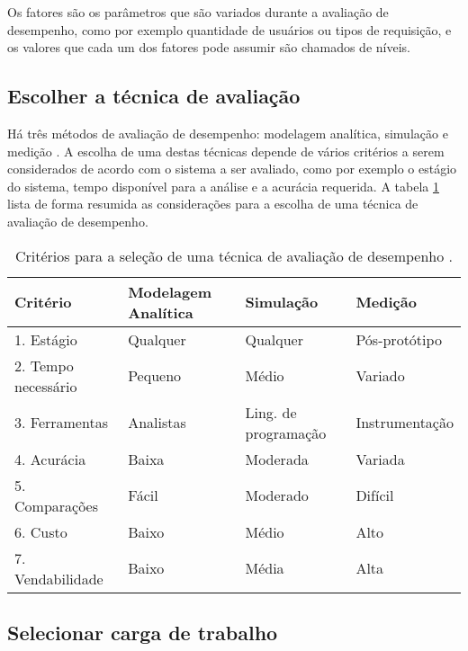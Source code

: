 Os fatores são os parâmetros que são variados durante a avaliação de desempenho, como por exemplo quantidade de usuários ou tipos de requisição, e os valores que cada um dos fatores pode assumir são chamados de níveis.

\subsection{Escolher a técnica de avaliação}

Há três métodos de avaliação de desempenho: modelagem analítica, simulação e medição \cite{jain1991art}. A escolha de uma destas técnicas depende de vários critérios a serem considerados de acordo com o sistema a ser avaliado, como por exemplo o estágio do sistema, tempo disponível para a análise e a acurácia requerida. A tabela \ref{tab:analysistech} lista de forma resumida as considerações para a escolha de uma técnica de avaliação de desempenho.

\begin{table}
  \centering
  \begin{tabular}{llll}
    \toprule
    Critério            & Modelagem Analítica & Simulação            & Medição        \\
    \midrule
    1. Estágio          & Qualquer            & Qualquer             & Pós-protótipo  \\
    2. Tempo necessário & Pequeno             & Médio                & Variado        \\
    3. Ferramentas      & Analistas           & Ling. de programação & Instrumentação \\
    4. Acurácia         & Baixa               & Moderada             & Variada        \\
    5. Comparações      & Fácil               & Moderado             & Difícil        \\
    6. Custo            & Baixo               & Médio                & Alto           \\
    7. Vendabilidade    & Baixo               & Média                & Alta           \\
    \bottomrule
  \end{tabular}
  \caption{Critérios para a seleção de uma técnica de avaliação de desempenho \cite{jain1991art}.}
  \label{tab:analysistech}
\end{table}

\subsection{Selecionar carga de trabalho}

